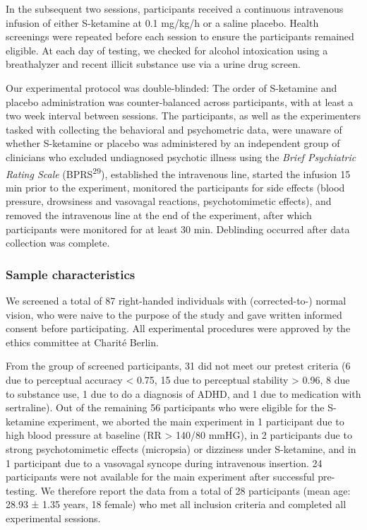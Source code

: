 \documentclass[
]{article}
\begin{document}
In the subsequent two sessions, participants received a continuous
intravenous infusion of either S-ketamine at 0.1 mg/kg/h or a saline
placebo. Health screenings were repeated before each session to ensure
the participants remained eligible. At each day of testing, we checked
for alcohol intoxication using a breathalyzer and recent illicit
substance use via a urine drug screen.

Our experimental protocol was double-blinded: The order of S-ketamine
and placebo administration was counter-balanced across participants,
with at least a two week interval between sessions. The participants, as
well as the experimenters tasked with collecting the behavioral and
psychometric data, were unaware of whether S-ketamine or placebo was
administered by an independent group of clinicians who excluded
undiagnosed psychotic illness using the \emph{Brief Psychiatric Rating
Scale} (BPRS\textsuperscript{29}), established the intravenous line,
started the infusion 15 min prior to the experiment, monitored the
participants for side effects (blood pressure, drowsiness and vasovagal
reactions, psychotomimetic effects), and removed the intravenous line at
the end of the experiment, after which participants were monitored for
at least 30 min. Deblinding occurred after data collection was complete.

\hypertarget{sample-characteristics}{%
\subsubsection{Sample characteristics}\label{sample-characteristics}}

We screened a total of 87 right-handed individuals with (corrected-to-)
normal vision, who were naive to the purpose of the study and gave
written informed consent before participating. All experimental
procedures were approved by the ethics committee at Charité Berlin.

From the group of screened participants, 31 did not meet our pretest
criteria (6 due to perceptual accuracy \textless{} 0.75, 15 due to
perceptual stability \textgreater{} 0.96, 8 due to substance use, 1 due
to do a diagnosis of ADHD, and 1 due to medication with sertraline). Out
of the remaining 56 participants who were eligible for the S-ketamine
experiment, we aborted the main experiment in 1 participant due to high
blood pressure at baseline (RR \textgreater{} 140/80 mmHG), in 2
participants due to strong psychotomimetic effects (micropsia) or
dizziness under S-ketamine, and in 1 participant due to a vasovagal
syncope during intravenous insertion. 24 participants were not available
for the main experiment after successful pre-testing. We therefore
report the data from a total of 28 participants (mean age: 28.93 ± 1.35
years, 18 female) who met all inclusion criteria and completed all
experimental sessions.
\end{document}

